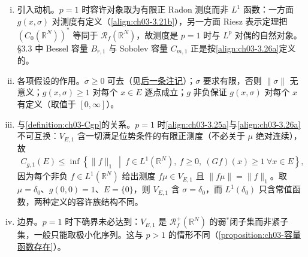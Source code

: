\documentclass[../../main.tex]{subfiles}%
\begin{document}
\begin{remark}\label{remark:ch03-Cg1动机}
\begin{enumerate}[(i)]
\item 引入动机。$p=1$ 时容许对象取为有限正 Radon 测度而非 $L^1$ 函数：一方面 $g(x,\sigma)$ 对测度有定义（\eqref{align:ch03-3.21b}），另一方面 Riesz 表示定理把 $(C_0(\mathbb{R}^N))^*$ 等同于 $\mathscr{R}_f(\mathbb{R}^N)$，故测度是 $p=1$ 时与 $L^p$ 对偶的自然对象。\S3.3 中 Bessel 容量 $B_{r,1}$ 与 Sobolev 容量 $C_{m,1}$ 正是按\eqref{align:ch03-3.26a}定义的。

\item 各项假设的作用。$\sigma\geqslant0$ 可去（见\hyperref[remark:ch03-非负可去]{后一条注记}）；$\sigma$ 要求有限，否则 $\|\sigma\|$ 无意义；$g(x,\sigma)\geqslant1$ 对每个 $x\in E$ 逐点成立；$g$ 非负保证 $g(x,\sigma)$ 对每个 $x$ 有定义（取值于 $[0,\infty]$）。

\item 与\cref{definition:ch03-Cgp}的关系。$p=1$ 时\eqref{align:ch03-3.25a}与\eqref{align:ch03-3.26a}不可互换：$V_{E,1}$ 含一切满足位势条件的有限正测度（不必关于 $\mu$ 绝对连续），故
\begin{align*}
C_{g,1}(E)\leqslant\inf\left\{\|f\|_1\ \middle|\ f\in L^1(\mathbb{R}^N),\ f\geqslant0,\ (Gf)(x)\geqslant1\ \forall x\in E\right\},
\end{align*}
因为每个非负 $f\in L^1(\mathbb{R}^N)$ 给出测度 $f\mu\in V_{E,1}$ 且 $\|f\mu\|=\|f\|_1$。取 $\mu=\delta_0$、$g(0,0)=1$、$E=\{0\}$，则 $V_{E,1}$ 含 $\sigma=\delta_0$，而 $L^1(\delta_0)$ 只含常值函数，两种定义的容许族结构不同。

\item 边界。$p=1$ 时下确界未必达到：$V_{E,1}$ 是 $\mathscr{R}^+_f(\mathbb{R}^N)$ 的弱$^*$闭子集而非紧子集，一般只能取极小化序列。这与 $p>1$ 的情形不同（\cref{proposition:ch03-容量函数存在}）。
\end{enumerate}
\end{remark}
\end{document}
